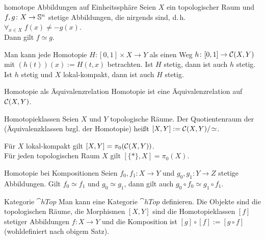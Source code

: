 \begin{Satz}{homotope Abbildungen auf Einheitssphäre}
    Seien $X$ ein topologischer Raum und \\
    $f, g\colon X \rightarrow \mathbb{S}^n$ stetige Abbildungen, die
    nirgends  sind, d.\,h.
    $\forall_{x \in X}\; f(x) \not= -g(x)$. \\
    Dann gilt $f \simeq g$.
\end{Satz}

\linie

\begin{Bem}
    Man kann jede Homotopie $H\colon [0, 1] \times X \rightarrow Y$ als einen
    Weg $h\colon [0, 1] \rightarrow \mathcal{C}(X, Y)$ mit $(h(t))(x) := H(t, x)$
    betrachten.
    Ist $H$ stetig, dann ist auch $h$ stetig. \\
    Ist $h$ stetig und $X$ lokal-kompakt, dann ist auch $H$ stetig.
\end{Bem}

\begin{Satz}{Homotopie als Äquivalenzrelation}
    Homotopie ist eine Äquivalenzrelation auf $\mathcal{C}(X, Y)$.
\end{Satz}

\begin{Def}{Homotopieklassen}
    Seien $X$ und $Y$ topologische Räume.
    Der Quotientenraum der \\
     (Äquivalenzklassen bzgl. der Homotopie) heißt
    $[X, Y] := \mathcal{C}(X, Y) /\! \simeq$.
\end{Def}

\begin{Bsp}
    Für $X$ lokal-kompakt gilt $[X, Y] = \pi_0(\mathcal{C}(X, Y))$. \\
    Für jeden topologischen Raum $X$ gilt $[\{\ast\}, X] = \pi_0(X)$.
\end{Bsp}

\begin{Satz}{Homotopie bei Kompositionen}
    Seien $f_0, f_1\colon X \rightarrow Y$ und $g_0, g_1\colon Y \rightarrow Z$
    stetige Abbildungen.
    Gilt $f_0 \simeq f_1$ und $g_0 \simeq g_1$, dann gilt auch
    $g_0 \circ f_0 \simeq g_1 \circ f_1$.
\end{Satz}

\begin{Def}{Kategorie $\cat{hTop}$}
    Man kann eine Kategorie $\cat{hTop}$ definieren.
    Die Objekte sind die topologischen Räume,
    die Morphismen $[X, Y]$ sind die Homotopieklassen $[f]$ stetiger
    Abbildungen $f\colon X \rightarrow Y$ und
    die Komposition ist $[g] \circ [f] := [g \circ f]$
    (wohldefiniert nach obigem Satz).
\end{Def}

